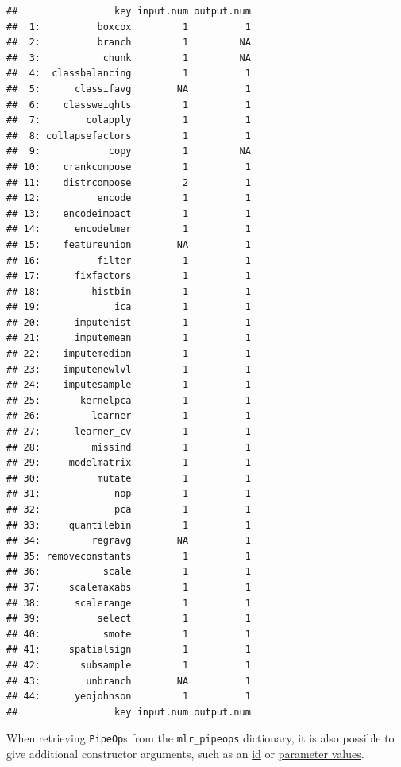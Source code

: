 \documentclass[]{article}
\newenvironment{Shaded}{\begin{snugshade}}{\end{snugshade}}
\newcommand{\DataTypeTok}[1]{\textcolor[rgb]{0.13,0.29,0.53}{#1}}
\newcommand{\DecValTok}[1]{\textcolor[rgb]{0.00,0.00,0.81}{#1}}
\newcommand{\KeywordTok}[1]{\textcolor[rgb]{0.13,0.29,0.53}{\textbf{#1}}}
\newcommand{\NormalTok}[1]{#1}
\newcommand{\OperatorTok}[1]{\textcolor[rgb]{0.81,0.36,0.00}{\textbf{#1}}}
\newcommand{\StringTok}[1]{\textcolor[rgb]{0.31,0.60,0.02}{#1}}
\renewenvironment{Shaded} {\begin{snugshade}\small} {\end{snugshade}}
\begin{document}
\begin{verbatim}
##                 key input.num output.num
##  1:          boxcox         1          1
##  2:          branch         1         NA
##  3:           chunk         1         NA
##  4:  classbalancing         1          1
##  5:      classifavg        NA          1
##  6:    classweights         1          1
##  7:        colapply         1          1
##  8: collapsefactors         1          1
##  9:            copy         1         NA
## 10:    crankcompose         1          1
## 11:    distrcompose         2          1
## 12:          encode         1          1
## 13:    encodeimpact         1          1
## 14:      encodelmer         1          1
## 15:    featureunion        NA          1
## 16:          filter         1          1
## 17:      fixfactors         1          1
## 18:         histbin         1          1
## 19:             ica         1          1
## 20:      imputehist         1          1
## 21:      imputemean         1          1
## 22:    imputemedian         1          1
## 23:    imputenewlvl         1          1
## 24:    imputesample         1          1
## 25:       kernelpca         1          1
## 26:         learner         1          1
## 27:      learner_cv         1          1
## 28:         missind         1          1
## 29:     modelmatrix         1          1
## 30:          mutate         1          1
## 31:             nop         1          1
## 32:             pca         1          1
## 33:     quantilebin         1          1
## 34:         regravg        NA          1
## 35: removeconstants         1          1
## 36:           scale         1          1
## 37:     scalemaxabs         1          1
## 38:      scalerange         1          1
## 39:          select         1          1
## 40:           smote         1          1
## 41:     spatialsign         1          1
## 42:       subsample         1          1
## 43:        unbranch        NA          1
## 44:      yeojohnson         1          1
##                 key input.num output.num
\end{verbatim}

When retrieving \texttt{PipeOp}s from the \texttt{mlr\_pipeops} dictionary, it is also possible to give additional constructor arguments, such as an \protect\hyperlink{pipeop-ids-and-id-name-clashes}{id} or \protect\hyperlink{hyperparameters}{parameter values}.

\begin{Shaded}
\end{Shaded}
\end{document}
